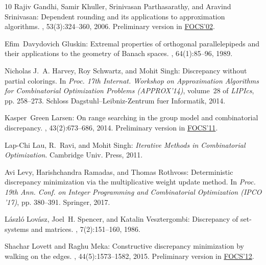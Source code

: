 \documentclass[11pt]{article}
\numberwithin{equation}{section}
\theoremstyle{definition}
\theoremstyle{plain}
\begin{document}
\begin{thebibliography}{10}
{\sc Rajiv Gandhi, Samir Khuller, Srinivasan Parthasarathy, and Aravind
  Srinivasan}: Dependent rounding and its applications to approximation
  algorithms.
, 53(3):324--360, 2006.
\newblock Preliminary version in
  \href{https://doi.org/10.1109/SFCS.2002.1181955}{FOCS'02}.
\newblock [\epfmtdoi{10.1145/1147954.1147956}]

{\sc Efim~Davydovich Gluskin}: Extremal properties of orthogonal
  parallelepipeds and their applications to the geometry of {B}anach spaces.
, 64(1):85--96, 1989.

{\sc Nicholas J.~A. Harvey, Roy Schwartz, and Mohit Singh}: Discrepancy without
  partial colorings.
\newblock In {\em Proc. 17th Internat. Workshop on Approximation Algorithms for
  Combinatorial Optimization Problems (APPROX'14)}, volume~28 of {\em LIPIcs},
  pp. 258--273. Schloss Dagstuhl--Leibniz-Zentrum fuer Informatik, 2014.

{\sc Kasper~Green Larsen}: On range searching in the group model and
  combinatorial discrepancy.
, 43(2):673--686, 2014.
\newblock Preliminary version in
  \href{https://doi.org/10.1109/FOCS.2011.14}{FOCS'11}.
\newblock [\epfmtdoi{10.1137/120865240}]

{\sc Lap-Chi Lau, R.~Ravi, and Mohit Singh}: {\em Iterative Methods in
  Combinatorial Optimization}.
\newblock Cambridge Univ. Press, 2011.

{\sc Avi Levy, Harishchandra Ramadas, and Thomas Rothvoss}: Deterministic
  discrepancy minimization via the multiplicative weight update method.
\newblock In {\em Proc. 19th Ann. Conf. on Integer Programming and
  Combinatorial Optimization (IPCO '17)}, pp. 380--391. Springer, 2017.

{\sc L{\'a}szl{\'o} Lov{\'a}sz, Joel~H. Spencer, and Katalin Vesztergombi}:
  Discrepancy of set-systems and matrices.
, 7(2):151--160, 1986.
\newblock [\epfmtdoi{10.1016/S0195-6698(86)80041-5}]

{\sc Shachar Lovett and Raghu Meka}: Constructive discrepancy minimization by
  walking on the edges.
, 44(5):1573--1582, 2015.
\newblock Preliminary version in
  \href{https://doi.org/10.1109/FOCS.2012.23}{FOCS'12}.


\end{thebibliography}
\end{document}
